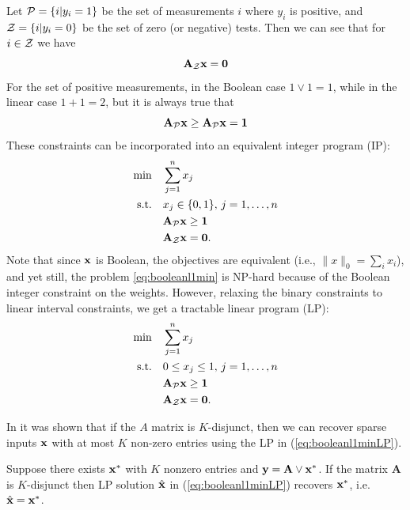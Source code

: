 Let $\mathcal{P}= \{i | y_i = 1\}$ be the set of measurements $i$ where $y_i$ is positive,
and $\mathcal{Z} = \{i | y_i = 0\}$ be the set of zero (or negative) tests. Then we can
see that for $i \in \mathcal{Z}$ we have
\begin{equation}
\mathbf{A}_{\mathcal{Z}}\mathbf{x} = \mathbf{0}
\end{equation}
For the set of positive measurements, in the Boolean case $1\lor 1 = 1$, while
in the linear case $1 + 1 = 2$, but it is always true that
\begin{equation}
\mathbf{A}_{\mathcal{P}}\mathbf{x} \ge \mathbf{A}_{\mathcal{P}}\mathbf{x} =\mathbf{1}
\end{equation}
These constraints can be incorporated into an equivalent integer program (IP):
\begin{align}
\label{eq:booleanl1min}
	\min\quad &\sum_{j=1}^{n} x_j \\
	\textrm{s.t.\quad} & x_j \in \{0,1\},\,j = 1,\ldots,n\nonumber\\
		& \mathbf{A}_{\mathcal{P}}\mathbf{x} \ge \mathbf{1}\nonumber\\
		& \mathbf{A}_{\mathcal{Z}}\mathbf{x} = \mathbf{0}.\nonumber
\end{align}
Note that since $\mathbf{x}$ is Boolean, the objectives are equivalent (i.e., $\|x\|_0=\sum_i{x_i}$), and yet still, the problem
\eqref{eq:booleanl1min} is NP-hard because of the Boolean integer constraint on the weights. However, relaxing the binary constraints to linear interval constraints, we get a tractable linear program (LP):
\begin{align}
\label{eq:booleanl1minLP}
	\min\quad &\sum_{j=1}^{n} x_j \\
	\textrm{s.t.\quad} & 0\leq x_j \leq 1, \,j = 1,\ldots,n\nonumber\\
		& \mathbf{A}_{\mathcal{P}}\mathbf{x} \ge \mathbf{1}\nonumber\\
		& \mathbf{A}_{\mathcal{Z}}\mathbf{x} = \mathbf{0}.\nonumber
\end{align}

In \cite{MalioutovM2012} it was shown that if the $A$ matrix is $K$-disjunct, 
then we can recover sparse inputs $\mathbf{x}$ with at most $K$ non-zero entries using 
the LP in (\ref{eq:booleanl1minLP}).
\begin{theorem}
\label{thm:LP_recovery}
Suppose there exists $\mathbf{x}^*$ with $K$ nonzero entries and
$\mathbf{y} = \mathbf{A} \lor \mathbf{x}^*$. If the matrix $\mathbf{A}$ is $K$-disjunct then
LP solution $\hat{\mathbf{x}}$ in (\ref{eq:booleanl1minLP}) recovers $\mathbf{x}^*$, i.e. $\hat{\mathbf{x}} = \mathbf{x}^*$.
\end{theorem}

